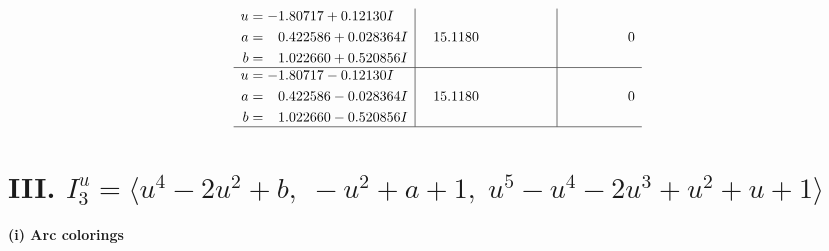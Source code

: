 \documentclass[1p]{elsarticle_modified}
\theoremstyle{definition}
\begin{document}
$$\begin{array}{c|c|c}
\begin{aligned}
u &= -1.80717 + 0.12130 I \\
a &= \phantom{-}0.422586 + 0.028364 I \\
b &= \phantom{-}1.022660 + 0.520856 I\end{aligned}
 & \phantom{-}15.1180\phantom{ +0.000000I} & \phantom{-0.000000 } 0 \\ \hline\begin{aligned}
u &= -1.80717 - 0.12130 I \\
a &= \phantom{-}0.422586 - 0.028364 I \\
b &= \phantom{-}1.022660 - 0.520856 I\end{aligned}
 & \phantom{-}15.1180\phantom{ +0.000000I} & \phantom{-0.000000 } 0\\
 \hline 
 \end{array}$$\newpage\newpage\renewcommand{\arraystretch}{1}
\centering \section*{III. $I^u_{3}= \langle u^4-2 u^2+b,\;- u^2+a+1,\;u^5- u^4-2 u^3+u^2+u+1 \rangle$}
\flushleft \textbf{(i) Arc colorings}\\
\end{document}
